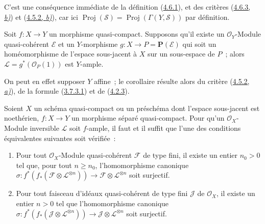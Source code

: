 C'est une conséquence immédiate de la définition
(\hyperref[II.4.6.1-fr]{4.6.1}), et des critères
(\hyperref[II.4.6.3-fr]{4.6.3, \emph{b)}}) et
(\hyperref[II.4.5.2-fr]{4.5.2, \emph{b)}}), car ici
$\operatorname{Proj}(\mathcal{S})
=\operatorname{Proj}(\Gamma(Y,\mathcal{S}))$ par définition.

\begin{corollary}[4.6.7]
\label{II.4.6.7-fr}
Soit $f:X\to Y$ un morphisme quasi-compact. Supposons qu'il existe un
$\mathcal{O}_Y$-Module quasi-cohérent $\mathcal{E}$ et un $Y$-morphisme
$g:X\to P=\mathbf{P}(\mathcal{E})$ qui soit un homéomorphisme de l'espace
sous-jacent à $X$ sur un sous-espace de $P$~; alors
$\mathcal{L}=g^*(\mathcal{O}_P(1))$ est $Y$-ample.
\end{corollary}

On peut en effet supposer $Y$ affine~; le corollaire résulte alors du
critère (\hyperref[II.4.5.2-fr]{4.5.2, \emph{a)}}), de la formule
(\hyperref[II.3.7.3.1-fr]{3.7.3.1}) et de
(\hyperref[II.4.2.3-fr]{4.2.3}).

\begin{proposition}[4.6.8]
\label{II.4.6.8-fr}
Soient $X$ un schéma quasi-compact ou un préschéma dont l'espace
sous-jacent est noethérien, $f:X\to Y$ un morphisme séparé quasi-compact.
Pour qu'un $\mathcal{O}_X$-Module inversible $\mathcal{L}$ soit $f$-ample,
il faut et il suffit que l'une des conditions équivalentes suivantes soit
vérifiée~:
\begin{enumerate}
  \item[\rm{c)}] Pour tout $\mathcal{O}_X$-Module quasi-cohérent
  $\mathcal{F}$ de type fini, il existe un entier $n_0>0$ tel que, pour
  tout $n\geq n_0$, l'homomorphisme canonique
  $\sigma:f^*(f_*(\mathcal{F}\otimes\mathcal{L}^{\otimes n}))\to
  \mathcal{F}\otimes\mathcal{L}^{\otimes n}$ soit surjectif.
  \item[\rm{c')}] Pour tout faisceau d'idéaux quasi-cohérent de type fini
  $\mathcal{J}$ de $\mathcal{O}_X$, il existe un entier $n>0$ tel que
  l'homomorphisme canonique
  $\sigma:f^*(f_*(\mathcal{J}\otimes\mathcal{L}^{\otimes n}))\to
  \mathcal{J}\otimes\mathcal{L}^{\otimes n}$ soit surjectif.
\end{enumerate}
\end{proposition}

